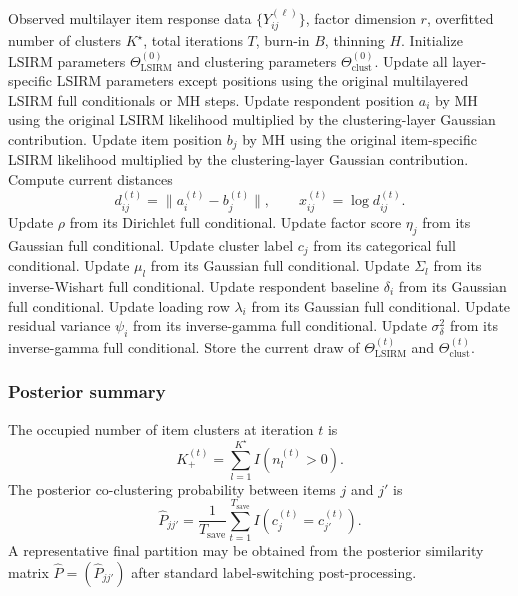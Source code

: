 \begin{algorithm}[H]
\caption{Joint multilayered LSIRM + item-only factor-mixture clustering}
\begin{algorithmic}[1]
\Require Observed multilayer item response data $\{Y_{ij}^{(\ell)}\}$, factor dimension $r$,
overfitted number of clusters $K^\star$, total iterations $T$, burn-in $B$, thinning $H$.
\State Initialize LSIRM parameters
$\Theta_{\mathrm{LSIRM}}^{(0)}$
and clustering parameters
$\Theta_{\mathrm{clust}}^{(0)}$.
    \State Update all layer-specific LSIRM parameters except positions
    using the original multilayered LSIRM full conditionals or MH steps.
        \State Update respondent position $a_i$ by MH using the original LSIRM likelihood
        multiplied by the clustering-layer Gaussian contribution.
    \EndFor
        \State Update item position $b_j$ by MH using the original item-specific LSIRM likelihood
        multiplied by the clustering-layer Gaussian contribution.
    \EndFor
    \State Compute current distances
    \[
    d_{ij}^{(t)} = \|a_i^{(t)}-b_j^{(t)}\|,
    \qquad
    x_{ij}^{(t)} = \log d_{ij}^{(t)}.
    \]
    \State Update $\rho$ from its Dirichlet full conditional.
        \State Update factor score $\eta_j$ from its Gaussian full conditional.
    \EndFor
        \State Update cluster label $c_j$ from its categorical full conditional.
    \EndFor
        \State Update $\mu_l$ from its Gaussian full conditional.
        \State Update $\Sigma_l$ from its inverse-Wishart full conditional.
    \EndFor
        \State Update respondent baseline $\delta_i$ from its Gaussian full conditional.
        \State Update loading row $\lambda_i$ from its Gaussian full conditional.
        \State Update residual variance $\psi_i$ from its inverse-gamma full conditional.
    \EndFor
    \State Update $\sigma_\delta^2$ from its inverse-gamma full conditional.
        \State Store the current draw of
        $\Theta_{\mathrm{LSIRM}}^{(t)}$ and $\Theta_{\mathrm{clust}}^{(t)}$.
    \EndIf
\EndFor
\end{algorithmic}
\end{algorithm}

\subsubsection{Posterior summary}

The occupied number of item clusters at iteration $t$ is
\[
K_+^{(t)} = \sum_{l=1}^{K^\star} I(n_l^{(t)} > 0).
\]
The posterior co-clustering probability between items $j$ and $j'$ is
\[
\widehat P_{jj'}
=
\frac{1}{T_{\mathrm{save}}}
\sum_{t=1}^{T_{\mathrm{save}}}
I\!\left(c_j^{(t)} = c_{j'}^{(t)}\right).
\]
A representative final partition may be obtained from the posterior similarity matrix
$\widehat P = (\widehat P_{jj'})$ after standard label-switching post-processing.